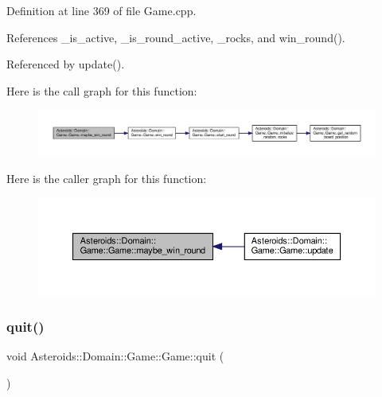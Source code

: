 Definition at line 369 of file Game.\+cpp.



References \+\_\+is\+\_\+active, \+\_\+is\+\_\+round\+\_\+active, \+\_\+rocks, and win\+\_\+round().



Referenced by update().

Here is the call graph for this function\+:\nopagebreak
\begin{figure}[H]
\begin{center}
\leavevmode
\includegraphics[width=350pt]{classAsteroids_1_1Domain_1_1Game_1_1Game_abf55b1a7206729ce7e384bc8e6cb73d0_cgraph}
\end{center}
\end{figure}
Here is the caller graph for this function\+:\nopagebreak
\begin{figure}[H]
\begin{center}
\leavevmode
\includegraphics[width=350pt]{classAsteroids_1_1Domain_1_1Game_1_1Game_abf55b1a7206729ce7e384bc8e6cb73d0_icgraph}
\end{center}
\end{figure}
\mbox{\label{classAsteroids_1_1Domain_1_1Game_1_1Game_a7e1bbc8f577a798f57d736bdc51fd149}} 
\subsubsection{\texorpdfstring{quit()}{quit()}}
{\footnotesize\ttfamily void Asteroids\+::\+Domain\+::\+Game\+::\+Game\+::quit (\begin{DoxyParamCaption}{ }\end{DoxyParamCaption})\hspace{0.3cm}{\ttfamily [virtual]}}




